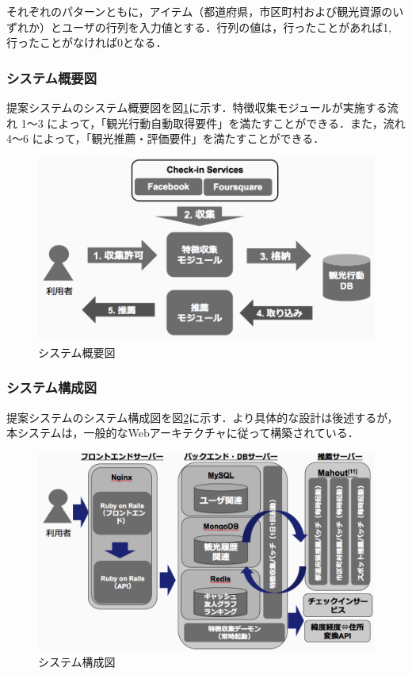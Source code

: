 \documentclass{jsarticle}
\begin{document}
それぞれのパターンともに，アイテム（都道府県，市区町村および観光資源のいずれか）とユーザの行列を入力値とする．行列の値は，行ったことがあれば1, 行ったことがなければ0となる．

\subsubsection{システム概要図}

提案システムのシステム概要図を図\ref{system2}に示す．特徴収集モジュールが実施する流れ 1〜3 によって，「観光行動自動取得要件」を満たすことができる．また，流れ 4〜6 によって，「観光推薦・評価要件」を満たすことができる．

\begin{figure}[!ht]
\begin{center}
\includegraphics[width=12.0cm]{./image/system2.png}
\caption{システム概要図}
\label{system2}
\end{center}
\end{figure}

\subsubsection{システム構成図}

提案システムのシステム構成図を図\ref{system1}に示す．より具体的な設計は後述するが，本システムは，一般的なWebアーキテクチャに従って構築されている．

\begin{figure}[!ht]
\begin{center}
\includegraphics[width=12.0cm]{./image/system1.png}
\caption{システム構成図}
\label{system1}
\end{center}
\end{figure}
\end{document}
